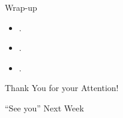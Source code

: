 \documentclass[notes=show,smaller,handout]{beamer}\usepackage[]{graphicx}\usepackage[]{color}
\begin{document}
\begin{frame}{Wrap-up}
  \begin{itemize}
  \item . \bigskip
  \item . \bigskip
  \item .\bigskip
  \end{itemize}
\end{frame}

\begin{frame}
  \begin{center}
  \Large{Thank You for your Attention!}

  \bigskip
  \pause

  \Large{``See you'' Next Week}
  \end{center}
\end{frame}
\end{document}
